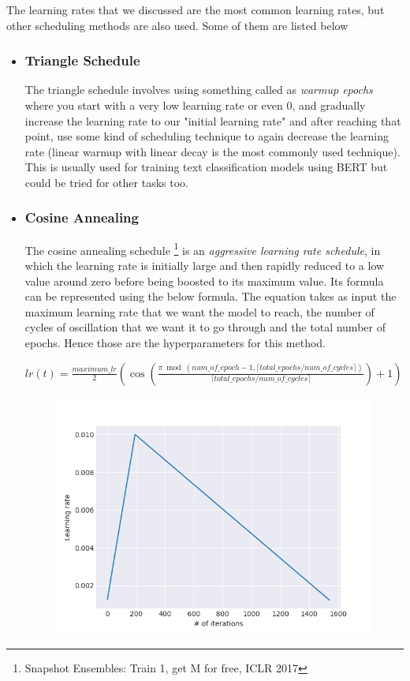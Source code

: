 The learning rates that we discussed are the most common learning rates, but other scheduling methods are also used. Some of them are listed below
\begin{itemize}
    \item \subsubsection{Triangle Schedule}
    The triangle schedule involves using something called as \textit{warmup epochs} where you start with a very low learning rate or even 0, and gradually increase the learning rate to our "initial learning rate" and after reaching that point, use some kind of scheduling technique to again decrease the learning rate (linear warmup with linear decay is the most commonly used technique). This is usually used for training text classification models using BERT but could be tried for other tasks too.
    \item \subsubsection{Cosine Annealing}
    The cosine annealing schedule \footnote{Snapshot Ensembles: Train 1, get M for free, ICLR 2017} is an \textit{aggressive learning rate schedule}, in which the learning rate is initially large and then rapidly reduced to a low value around zero before being boosted to its maximum value. Its formula can be represented using the below formula. The equation takes as input the maximum learning rate that we want the model to reach, the number of cycles of oscillation that we want it to go through and the total number of epochs. Hence those are the hyperparameters for this method.
    \begin{center}
    \begin{math}
    lr(t)=\frac{maximum\_lr}{2}\left(\cos \left(\frac{\pi \bmod (num\_of\_epoch-1,\lceil total\_epochs / num\_of\_cycles\rceil)}{\lceil total\_epochs / num\_of\_cycles\rceil}\right)+1\right)
    \end{math}  
    \end{center}
    \begin{figure}[!ht]
  \centering
  \begin{minipage}[b]{0.4\textwidth}
    \includegraphics[width=\textwidth]{./imgs/2019A7PS0097P-11.jpg}

\end{minipage}
\end{figure}
\end{itemize}
